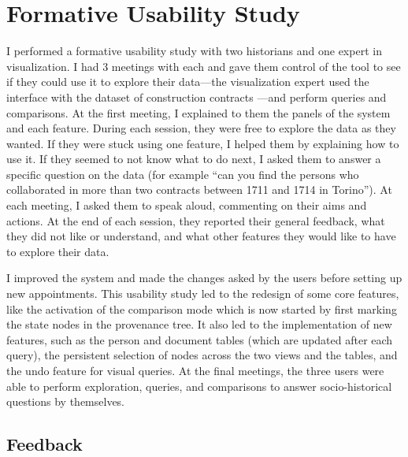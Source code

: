 \section{Formative Usability Study}\label{sec:combinet-usability}


I performed a formative usability study with two historians and one expert in visualization.
I had 3 meetings with each and gave them control of the tool to see if they could use it to explore their data---the visualization expert used the interface with the dataset of construction contracts \pascal---and perform queries and comparisons.
At the first meeting, I explained to them the panels of the system and each feature.
During each session, they were free to explore the data as they wanted.
If they were stuck using one feature, I helped them by explaining how to use it.
If they seemed to not know what to do next, I asked them to answer a specific question on the data (for example ``can you find the persons who collaborated in more than two contracts between 1711 and 1714 in Torino'').
At each meeting, I asked them to speak aloud, commenting on their aims and actions.
At the end of each session, they reported their general feedback, what they did not like or understand, and what other features they would like to have to explore their data.

I improved the system and made the changes asked by the users before setting up new appointments.
This usability study led to the redesign of some core features, like the activation of the comparison mode which is now started by first marking the state nodes in the provenance tree.
It also led to the implementation of new features, such as the person and document tables (which are updated after each query), the persistent selection of nodes across the two views and the tables, and the undo feature for visual queries.
At the final meetings, the three users were able to perform exploration, queries, and comparisons to answer socio-historical questions by themselves.


\subsection{Feedback}

